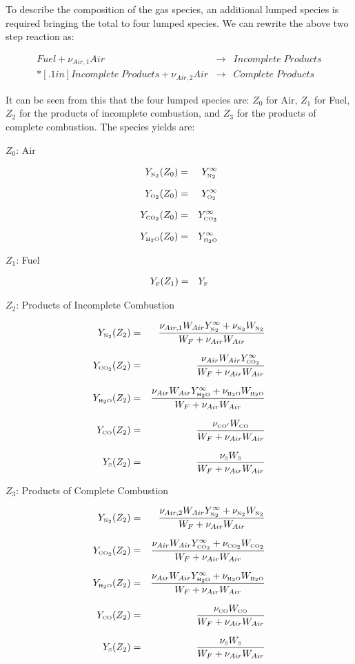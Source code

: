 To describe the composition of the gas species, an additional lumped species is required bringing the total to four lumped species.  We can rewrite the above two step reaction as:

\begin{eqnarray}
Fuel + \nu_{Air,1} Air &\rightarrow&  Incomplete \; Products\\*[.1in]
Incomplete \; Products + \nu_{Air,2} Air &\rightarrow&  Complete \; Products
\label{4lumped}
\end{eqnarray}

It can be seen from this that the four lumped species are: $Z_0$ for Air, $Z_1$ for Fuel, $Z_2$ for the products of incomplete combustion, and $Z_3$ for the products of complete combustion.  The species yields are:

$Z_0$: Air

\begin{eqnarray}
Y_{{\tiny \hbox{N}_2}}(Z_0) & = & Y_{\tiny \hbox{N}_2}^\infty\\*[.1in]
Y_{{\tiny \hbox{O}_2}}(Z_0) & = & Y_{\tiny \hbox{O}_2}^\infty\\*[.1in]
Y_{{\tiny \hbox{CO}_2}}(Z_0) & = & Y_{\tiny \hbox{CO}_2}^\infty\\*[.1in]
Y_{{\tiny \hbox{H}_2\hbox{O}}}(Z_0) & = & Y_{\tiny \hbox{H}_2\hbox{O}}^\infty
\end{eqnarray}

$Z_1$: Fuel

\begin{eqnarray}
Y_{{\tiny \hbox{F}}}(Z_1) & = & Y_{\tiny \hbox{F}}
\end{eqnarray}

$Z_2$: Products of Incomplete Combustion

\begin{eqnarray}
Y_{{\tiny \hbox{N}_2}}(Z_2) & = & \frac{\nu_{Air,1} W_{Air} Y_{\tiny \hbox{N}_2}^\infty +\nu_{{\tiny \hbox{N}_2}} W_{{\tiny \hbox{N}_2}}}{W_F + \nu_{Air} W_{Air}}\\*[.1in]
Y_{{\tiny \hbox{CO}_2}}(Z_2) & = & \frac{\nu_{Air} W_{Air} Y_{\tiny \hbox{CO}_2}^\infty}{W_F + \nu_{Air} W_{Air}} \\*[.1in]
Y_{{\tiny \hbox{H}_2\hbox{O}}}(Z_2) & = & \frac{\nu_{Air} W_{Air}  Y_{\tiny \hbox{H}_2\hbox{O}}^\infty +\nu_{{\tiny \hbox{H}_2\hbox{O}}} W_{{\tiny \hbox{H}_2\hbox{O}}}}{W_F + \nu_{Air} W_{Air}}\\*[.1in]
Y_{{\tiny \hbox{CO}}}(Z_2) & = & \frac{\nu_{{\tiny \hbox{CO}}'} W_{{\tiny \hbox{CO}}}}{W_F + \nu_{Air} W_{Air}}\\*[.1in]
Y_{{\tiny \hbox{S}}}(Z_2) & = & \frac{\nu_{{\tiny \hbox{S}}} W_{{\tiny \hbox{S}}}}{W_F + \nu_{Air} W_{Air}}
\end{eqnarray}

$Z_3$: Products of Complete Combustion

\begin{eqnarray}
Y_{{\tiny \hbox{N}_2}}(Z_2) & = & \frac{\nu_{Air,2} W_{Air}  Y_{\tiny \hbox{N}_2}^\infty +\nu_{{\tiny \hbox{N}_2}} W_{{\tiny \hbox{N}_2}}}{W_F + \nu_{Air} W_{Air}}\\*[.1in]
Y_{{\tiny \hbox{CO}_2}}(Z_2) & = & \frac{\nu_{Air} W_{Air}  Y_{\tiny \hbox{CO}_2}^\infty +\nu_{{\tiny \hbox{CO}_2}} W_{{\tiny \hbox{CO}_2}}}{W_F + \nu_{Air} W_{Air}}\\*[.1in]
Y_{{\tiny \hbox{H}_2\hbox{O}}}(Z_2) & = & \frac{\nu_{Air} W_{Air}  Y_{\tiny \hbox{H}_2\hbox{O}}^\infty +\nu_{{\tiny \hbox{H}_2\hbox{O}}} W_{{\tiny \hbox{H}_2\hbox{O}}}}{W_F + \nu_{Air} W_{Air}}\\*[.1in]
Y_{{\tiny \hbox{CO}}}(Z_2) & = & \frac{\nu_{\tiny \hbox{CO}} W_{{\tiny \hbox{CO}}}}{W_F + \nu_{Air} W_{Air}}\\*[.1in]
Y_{{\tiny \hbox{S}}}(Z_2) & = & \frac{\nu_{{\tiny \hbox{S}}} W_{{\tiny \hbox{S}}}}{W_F + \nu_{Air} W_{Air}}
\end{eqnarray}


